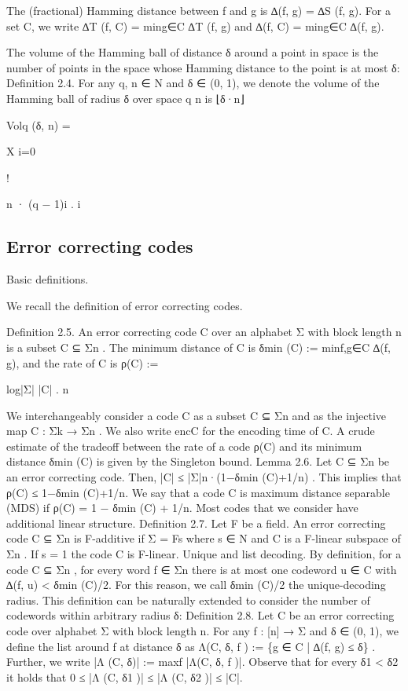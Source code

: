 \documentclass[11pt]{article}
\begin{document}
The (fractional) Hamming distance between f and g is ∆(f, g) = ∆S (f, g). For a set C, we
write ∆T (f, C) = ming∈C ∆T (f, g) and ∆(f, C) = ming∈C ∆(f, g).

The volume of the Hamming ball of distance δ around a point in space is the number of points
in the space whose Hamming distance to the point is at most δ:
Definition 2.4. For any q, n ∈ N and δ ∈ (0, 1), we denote the volume of the Hamming ball
of radius δ over space q n is
⌊δ·n⌋

Volq (δ, n) =

X
i=0

!

n
· (q − 1)i .
i

\subsection{Error correcting codes}


Basic definitions.

We recall the definition of error correcting codes.

Definition 2.5. An error correcting code C over an alphabet Σ with block length n is a subset
C ⊆ Σn . The minimum distance of C is δmin (C) := minf,g∈C ∆(f, g), and the rate of C is
ρ(C) :=

log|Σ| |C|
.
n

We interchangeably consider a code C as a subset C ⊆ Σn and as the injective map C : Σk → Σn .
We also write encC for the encoding time of C.
A crude estimate of the tradeoff between the rate of a code ρ(C) and its minimum distance
δmin (C) is given by the Singleton bound.
Lemma 2.6. Let C ⊆ Σn be an error correcting code. Then,
|C| ≤ |Σ|n·(1−δmin (C)+1/n) .
This implies that ρ(C) ≤ 1−δmin (C)+1/n. We say that a code C is maximum distance separable
(MDS) if ρ(C) = 1 − δmin (C) + 1/n.
Most codes that we consider have additional linear structure.
Definition 2.7. Let F be a field. An error correcting code C ⊆ Σn is F-additive if Σ = Fs where
s ∈ N and C is a F-linear subspace of Σn . If s = 1 the code C is F-linear.
Unique and list decoding. By definition, for a code C ⊆ Σn , for every word f ∈ Σn there
is at most one codeword u ∈ C with ∆(f, u) < δmin (C)/2. For this reason, we call δmin (C)/2 the
unique-decoding radius. This definition can be naturally extended to consider the number of
codewords within arbitrary radius δ:
Definition 2.8. Let C be an error correcting code over alphabet Σ with block length n. For any
f : [n] → Σ and δ ∈ (0, 1), we define the list around f at distance δ as
Λ(C, δ, f ) := \{g ∈ C | ∆(f, g) ≤ δ\} .
Further, we write |Λ (C, δ)| := maxf |Λ(C, δ, f )|.
Observe that for every δ1 < δ2 it holds that 0 ≤ |Λ (C, δ1 )| ≤ |Λ (C, δ2 )| ≤ |C|.
\end{document}
